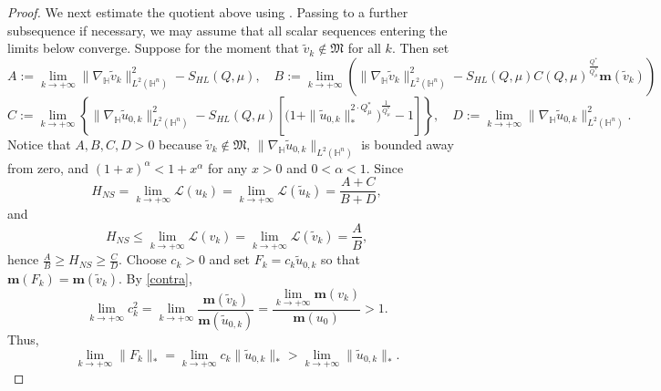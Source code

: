 \documentclass[10pt,a4paper]{amsart}
\begin{document}
\begin{proof}
{We next estimate the quotient above using \cite[Lemmas 2.3-2.4]{K25}.} {Passing to a further subsequence if necessary, we may assume that all scalar sequences entering the limits below converge.} Suppose for the moment that $\tilde{v}_k\notin \mathfrak{M}$ for all $k$. Then set
 \begin{equation*}
 A:=\lim\limits_{k\rightarrow+\infty}\|\nabla_\mathbb{H} \tilde{v}_k\|_{L^2(\mathbb{H}^n)}^2-S_{HL}(Q,\mu),\quad B:=\lim\limits_{k\rightarrow+\infty}\left(\|\nabla_\mathbb{H} \tilde{v}_k\|_{L^2(\mathbb{H}^n)}^2-S_{HL}(Q,\mu)C(Q,\mu)^{\frac{Q^{\ast}}{Q^{\ast}_{\mu}}}\mathbf{m}(\tilde{v}_k)\right)
 \end{equation*}
 \begin{equation*}
 C:=\lim\limits_{k\rightarrow+\infty}\left\{\|\nabla_\mathbb{H} \tilde{u}_{0,k}\|_{L^2(\mathbb{H}^n)}^2-S_{HL}(Q,\mu) \left[\Big(1+\|\tilde{u}_{0,k}\|_*^{2\cdot Q^{\ast}_{\mu}}\Big)^{\frac{1}{Q^{\ast}_{\mu}}}-1\right]\right\},\quad D:=\lim\limits_{k\rightarrow+\infty}\|\nabla_\mathbb{H} \tilde{u}_{0,k}\|_{L^2(\mathbb{H}^n)}^2.
 \end{equation*}
 Notice that $A,B,C,D>0$ because $\tilde{v}_k\notin \mathfrak{M}$, $\|\nabla_\mathbb{H} \tilde{u}_{0,k}\|_{L^2(\mathbb{H}^n)}$ is bounded away from zero, and $(1+x)^\alpha<1+x^\alpha$ for any $x>0$ and $0<\alpha<1$. Since
 \begin{equation*}
 H_{NS}=\lim\limits_{k\rightarrow+\infty} \mathcal{L}(u_k)=\lim\limits_{k\rightarrow+\infty} \mathcal{L} (\tilde{u}_k)=\frac{A+C}{B+D},
 \end{equation*}
 and
 \begin{equation*}
 H_{NS}\leq \lim\limits_{k\rightarrow+\infty} \mathcal{L}(v_k)=\lim\limits_{k\rightarrow+\infty} \mathcal{L} (\tilde{v}_k)=\frac{A}{B},
 \end{equation*}
 {hence $\frac{A}{B}\geq H_{NS}\geq\frac{C}{D}$.} {Choose $c_k>0$ and set $F_k=c_k\tilde{u}_{0,k}$ so that $\mathbf{m}(F_k)=\mathbf{m}(\tilde{v}_k)$. By \eqref{contra},}
 \begin{equation*}
 \lim\limits_{k\rightarrow+\infty}c_k^2=\lim\limits_{k\rightarrow+\infty}\frac{\mathbf{m}(\tilde{v}_k)}{\mathbf{m}(\tilde{u}_{0,k})}=
 \frac{\lim\limits_{k\rightarrow+\infty}\mathbf{m}(v_k)}{\mathbf{m}(u_0)}>1.
 \end{equation*}
 Thus,
 \begin{equation*}
 {\lim\limits_{k\rightarrow+\infty}\|F_k\|_*=\lim\limits_{k\rightarrow+\infty}c_k\|\tilde{u}_{0,k}\|_*>\lim\limits_{k\rightarrow+\infty}\|\tilde{u}_{0,k}\|_*.}
 \end{equation*}

\end{proof}
\end{document}
